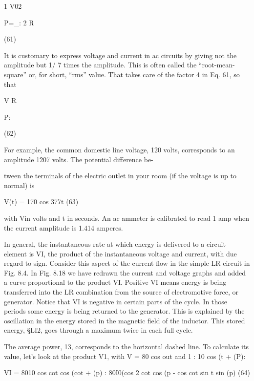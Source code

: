 {\begin{equation}
\end{equation}
1 V02

P=_:
2 R

(61)

It is customary to express voltage and current in ac circuits by giving
not the amplitude but 1/ \/7 times the amplitude. This is often called
the ``root-mean-square'' or, for short, ``rms'' value. That takes care
of the factor 4 in Eq. 61, so that

\begin{equation}
\end{equation}
V%
R

P:

(62)

For example, the common domestic line voltage, 120 volts, corresponds
to an amplitude 120\/7 volts. The potential difference be-

tween the terminals of the electric outlet in your room (if the voltage
is up to normal) is

\begin{equation}
\end{equation}
V(t) = 170 cos 377t (63)

with Vin volts and t in seconds. An ac ammeter is calibrated to read
1 amp when the current amplitude is 1.414 amperes.

In general, the instantaneous rate at which energy is delivered to
a circuit element is VI, the product of the instantaneous voltage and
current, with due regard to sign. Consider this aspect of the current
flow in the simple LR circuit in Fig. 8.4. In Fig. 8.18 we have redrawn
the current and voltage graphs and added a curve proportional to
the product VI. Positive VI means energy is being transferred into
the LR combination from the source of electromotive force, or
generator. Notice that VI is negative in certain parts of the cycle.
In those periods some energy is being returned to the generator.
This is explained by the oscillation in the energy stored in the magnetic
field of the inductor. This stored energy, §LI2, goes through
a maximum twice in each full cycle.

The average power, 13, corresponds to the horizontal dashed line.
To calculate its value, let's look at the product V1, with V = 80 cos out
and 1 : 10 cos (\omega t + (P):

\begin{equation}
\end{equation}
VI = 8010 cos cot cos (cot + (p)
: 80I0(cos 2 cot cos (p - cos cot sin \omega t sin (p) (64)

}
